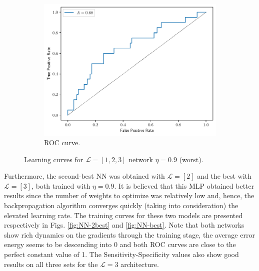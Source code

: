 \documentclass[conference]{IEEEtran}
\theoremstyle{definition}
\theoremstyle{remark}
\theoremstyle{remark}
\begin{document}
\begin{figure}
\begin{subfigure}[b]{0.32\textwidth}
        \includegraphics[width=\textwidth]{figs/1-2-3-0.9-roc.pdf}
        \caption{ROC curve.}
        \label{subfig:roc-worst-NN}
    \end{subfigure}
    \caption{Learning curves for $\mathcal{L}=[1,2,3]$ network $\eta=0.9$
    (worst).}
    \label{fig:NN-worst}
\end{figure}

Furthermore, the second-best NN was obtained with $\mathcal{L}=[2]$ and the best
with $\mathcal{L}=[3]$, both trained with $\eta=0.9$. It is believed that this
MLP obtained better results since the number of weights to optimize was
relatively low and, hence, the backpropagation algorithm converges quickly
(taking into consideration) the elevated learning rate. The training curves for
these two models are presented respectively in Figs. \ref{fig:NN-2best} and
\ref{fig:NN-best}. Note that both networks show rich dynamics on the gradients
through the training stage, the average error energy seems to be descending into
0 and both ROC curves are close to the perfect constant value of 1. The
Sensitivity-Specificity values also show good results on all three sets for the
$\mathcal{L}=3$ architecture.
\end{document}
